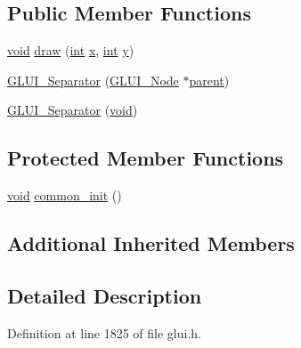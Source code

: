 \subsection*{Public Member Functions}
\begin{DoxyCompactItemize}
\item 
\hyperlink{wglext_8h_a9e6b7f1933461ef318bb000d6bd13b83}{void} \hyperlink{class_g_l_u_i___separator_aff41b79985e74c612fd1445aa8f841e6}{draw} (\hyperlink{wglext_8h_a500a82aecba06f4550f6849b8099ca21}{int} \hyperlink{glext_8h_ad77deca22f617d3f0e0eb786445689fc}{x}, \hyperlink{wglext_8h_a500a82aecba06f4550f6849b8099ca21}{int} \hyperlink{glext_8h_a9298c7ad619074f5285b32c6b72bfdea}{y})
\item 
\hyperlink{class_g_l_u_i___separator_aaa4d14c71c705d582f84e2f33a31609c}{G\+L\+U\+I\+\_\+\+Separator} (\hyperlink{class_g_l_u_i___node}{G\+L\+U\+I\+\_\+\+Node} $\ast$\hyperlink{class_g_l_u_i___node_a8ed65d447784f6f88bd3e2e2bcac6cdb}{parent})
\item 
\hyperlink{class_g_l_u_i___separator_a186bf983653c61471b0c6635710e19a4}{G\+L\+U\+I\+\_\+\+Separator} (\hyperlink{wglext_8h_a9e6b7f1933461ef318bb000d6bd13b83}{void})
\end{DoxyCompactItemize}
\subsection*{Protected Member Functions}
\begin{DoxyCompactItemize}
\item 
\hyperlink{wglext_8h_a9e6b7f1933461ef318bb000d6bd13b83}{void} \hyperlink{class_g_l_u_i___separator_a45dd556a76d5492f16d071b6c250fcf5}{common\+\_\+init} ()
\end{DoxyCompactItemize}
\subsection*{Additional Inherited Members}


\subsection{Detailed Description}


Definition at line 1825 of file glui.\+h.



